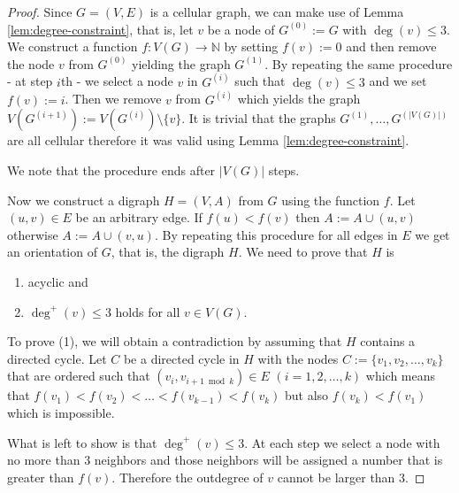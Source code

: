 \documentclass[letterpaper, 10 pt, conference]{ieeeconf}  %
\begin{document}
\begin{proof} Since $G=(V,E)$ is a cellular graph, we can make use of Lemma \ref{lem:degree-constraint}, that is, let $v$ be a node of $G^{(0)}:=G$ with $\deg(v) \leqslant 3$. We construct a function $f\colon V(G) \to \mathbb{N}$ by setting $f(v) := 0$ and then remove the node $v$ from $G^{(0)}$ yielding the graph $G^{(1)}$. By repeating the same procedure - at step $i$th - we select a node $v$ in $G^{(i)}$ such that $\deg(v) \leqslant 3$ and we set $f(v):=i$. Then we remove $v$ from $G^{(i)}$ which yields the graph $V(G^{(i+1)}) := V(G^{(i)}) \setminus \lbrace v \rbrace$. It is trivial that the graphs $G^{(1)},\ldots,G^{(|V(G)|)}$ are all cellular therefore it was valid using Lemma \ref{lem:degree-constraint}.

We note that the procedure ends after $|V(G)|$ steps.

Now we construct a digraph $H=(V,A)$ from $G$ using the function $f$. Let $(u,v) \in E$ be an arbitrary edge. If $f(u) < f(v)$ then $A:=A\cup (u,v)$ otherwise $A:=A \cup (v,u)$. By repeating this procedure for all edges in $E$ we get an orientation of $G$, that is, the digraph $H$. We need to prove that $H$ is
\begin{enumerate}
\item acyclic and
\item $\deg^+(v) \leqslant 3$ holds for all $v \in V(G)$.
\end{enumerate}
To prove (1), we will obtain a contradiction by assuming that $H$ contains a directed cycle. Let $C$ be a directed cycle in $H$ with the nodes $C:=\lbrace v_1,v_2,\ldots,v_k \rbrace$ that are ordered such that $(v_i,v_{i+1 \bmod{k}}) \in E$ $(i=1,2,\ldots,k)$ which means that $f(v_1) < f(v_2) < \ldots < f(v_{k-1}) < f(v_k)$ but also $f(v_k) < f(v_1)$ which is impossible.

What is left to show is that $\deg^+(v) \leqslant 3$. At each step we select a node with no more than $3$ neighbors and those neighbors will be assigned a number that is greater than $f(v)$. Therefore the outdegree of $v$ cannot be larger than $3$.
\end{proof}
\end{document}
